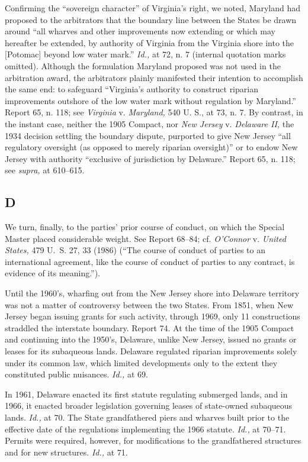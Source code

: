 {{  Confirming the ``sovereign character'' of Virginia's right, we
noted, Maryland had proposed to the arbitrators that the boundary
line between the States be drawn around ``all wharves and other
improvements now extending or which may hereafter be extended, by
authority of Virginia from the Virginia shore into the [Potomac] beyond
low water mark.'' \emph{Id.,} at 72, n. 7 (internal quotation marks
omitted). Although the formulation Maryland proposed was not used
in the arbitration award, the arbitrators plainly manifested their
intention to accomplish the same end: to safeguard ``Virginia's
authority to construct riparian improvements outshore of the low water
mark without regulation by Maryland.'' Report 65, n. 118; see
\emph{Virginia} v. \emph{Maryland,} 540 U. S., at 73, n. 7. By contrast,
in the instant case, neither the 1905 Compact, nor \emph{New Jersey} v.
\emph{Delaware II,} the 1934 decision settling the boundary dispute,
purported to give New Jersey ``all regulatory oversight (as opposed
to merely riparian oversight)'' or to endow New Jersey with authority
``exclusive of jurisdiction by Delaware.'' Report 65, n. 118; see
\emph{supra,} at 610--615.

\subsection{D}

  We turn, finally, to the parties' prior course of conduct, on which
the Special Master placed considerable weight. See Report 68--84; cf.
\emph{O'Connor} v. \emph{United States,} 479 U.~S. 27, 33 \newpage  (1986)
(``The course of conduct of parties to an international agreement, like
the course of conduct of parties to any contract, is evidence of its
meaning.'').

  Until the 1960's, wharfing out from the New Jersey shore into
Delaware territory was not a matter of controversy between the two
States. From 1851, when New Jersey began issuing grants for such
activity, through 1969, only 11 constructions straddled the interstate
boundary. Report 74. At the time of the 1905 Compact and continuing
into the 1950's, Delaware, unlike New Jersey, issued no grants
or leases for its subaqueous lands. Delaware regulated riparian
improvements solely under its common law, which limited developments
only to the extent they constituted public nuisances. \emph{Id.,} at
69.

  In 1961, Delaware enacted its first statute regulating submerged
lands, and in 1966, it enacted broader legislation governing leases
of state-owned subaqueous lands. \emph{Id.,} at 70. The State
grandfathered piers and wharves built prior to the effective date of
the regulations implementing the 1966 statute. \emph{Id.,} at 70--71.
Permits were required, however, for modifications to the grandfathered
structures and for new structures. \emph{Id.,} at 71. \footnotemark[18]

}}
